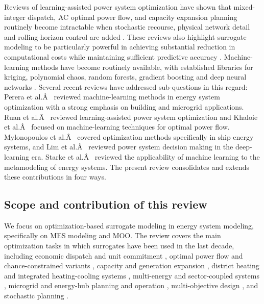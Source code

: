 Reviews of learning-assisted power system optimization have shown that
mixed-integer dispatch, AC optimal power flow, and capacity expansion
planning routinely become intractable when stochastic recourse, physical
network detail and rolling-horizon control are added
\cite{Ruan2021221,Khaloie2025,Lim2025,Mylonopoulos202332697,Perera2019191}.
These reviews also highlight surrogate modeling to be particularly
powerful in achieving substantial reduction in computational costs while
maintaining sufficient predictive accuracy
\cite{Ruan2021221,Perera2019191,Starke2025214,Khaloie2025,Mylonopoulos202332697}.
Machine-learning methods have become routinely available, with
established libraries for kriging, polynomial chaos, random forests,
gradient boosting and deep neural networks
\cite{Perera2019191,Starke2025214,Khaloie2025,Elsheikh2019622}.
Several recent reviews have addressed sub-questions in this regard:
Perera et al.Â~\cite{Perera2019191} reviewed machine-learning methods in
energy system optimization with a strong emphasis on building and
microgrid applications. Ruan et al.Â~\cite{Ruan2021221} reviewed
learning-assisted power system optimization and Khaloie et
al.Â~\cite{Khaloie2025} focused on machine-learning techniques for optimal
power flow. Mylonopoulos et al.Â~\cite{Mylonopoulos202332697} covered
optimization methods specifically in ship energy systems, and Lim et
al.Â~\cite{Lim2025} reviewed power system decision making in the
deep-learning era. Starke et al.Â~\cite{Starke2025214} reviewed the
applicability of machine learning to the metamodeling of energy systems.
The present review consolidates and extends these contributions in four
ways.

\subsection{Scope and contribution of this review}
\label{sec:intro:scope}

We focus on optimization-based surrogate modeling in energy system
modeling, specifically on MES modeling and MOO. The review covers the
main optimization tasks in which surrogates have been used in the last
decade, including economic dispatch and unit commitment
\cite{Wu2022231,Chen20244723,Chen2022,Nikolaidis2021,Lu20232989,Safta20172535,Wang20211767,Pang2023},
optimal power flow and chance-constrained variants
\cite{Muhlpfordt20194806,Su2022315,Deng2020831,Liu20223726,Chen2023657,Koirala20242284,Xu20212696,Srithapon202134395,Urgun20202791},
capacity and generation expansion
\cite{Rodgers2018951,Jahangiri20244849,Jahangiri2023,Han2018622,Fu20202904,Fu2022},
district heating and integrated heating-cooling systems
\cite{Koschwitz2018134,Zhou2024,Jia2022553,Hirvonen2017323,Reynolds2017704,Gao2025,Petrova2025},
multi-energy and sector-coupled systems
\cite{Zhou20181,Zheng20231907,Ren2024,Jalving2023,Dong2023,Yin2024},
microgrid and energy-hub planning and operation
\cite{Faraji2020157284,Nematollahi2021,Wang20192635,Hussien20211883,Rigo-Mariani20171762,Cao2023__2,Li2023__3},
multi-objective design
\cite{Thrampoulidis2021,Hussien20211883,Schulte2020,Han2018622},
and stochastic planning
\cite{Zhou20181,Fu20202904,Fu2022,Yang2024,Dong2022,Chen2023657,Xu20212696,Liang20246508,Dong2023}.

